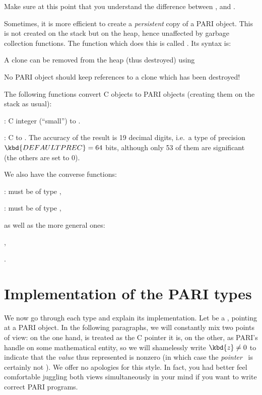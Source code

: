 Make sure at this point that you understand the difference between
,  and .

\label{se:clone}
Sometimes, it is more efficient to create a \emph{persistent} copy of a PARI
object. This is not created on the stack but on the heap, hence unaffected by
garbage collection functions. The function which does this is called
. Its syntax is:


A clone can be removed from the heap (thus destroyed) using


\noindent No PARI object should keep references to a clone which has been
destroyed!

The following functions convert C objects to PARI objects (creating them on
the stack as usual):

: C  integer  (``small'') to .

: C  to . The accuracy of
the result is 19 decimal digits, i.e.~a type  of precision
$\kbd{DEFAULTPREC} = 64$ bits, although only 53 of them are significant
(the others are set to $0$).

\noindent We also have the converse functions:

:  must be of type ,

:  must be of type ,

\noindent as well as the more general ones:

,

.

\section{Implementation of the PARI types}
\label{se:impl}

\noindent
We now go through each type and explain its implementation. Let  be a
, pointing at a PARI object. In the following paragraphs, we will
constantly mix two points of view: on the one hand,  is treated as the
C pointer it is, on the other, as PARI's handle on some mathematical entity,
so we will shamelessly write $\kbd{z} \ne 0$ to indicate that the
\emph{value} thus represented is nonzero (in which case the
\emph{pointer}~ is certainly not ). We offer no apologies
for this style. In fact, you had better feel comfortable juggling both views
simultaneously in your mind if you want to write correct PARI programs.

